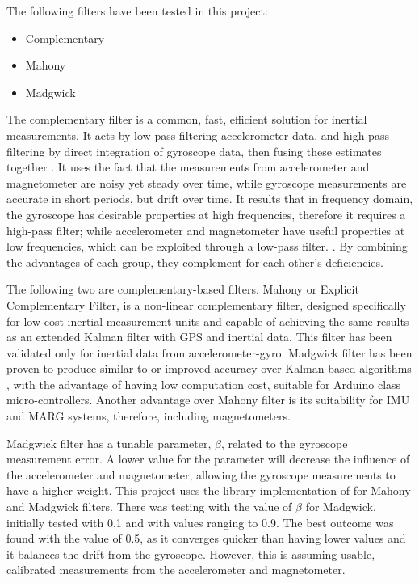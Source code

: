 The following filters have been tested in this project:
 
\begin{itemize}
\item Complementary
\item Mahony
\item Madgwick
\end{itemize}

The complementary filter is a common, fast, efficient solution for inertial measurements. It acts by low-pass filtering accelerometer data, and high-pass filtering by direct integration of gyroscope data, then fusing  these estimates together \cite{euston2008complementary}. 
It uses the fact that the measurements from accelerometer and magnetometer are noisy yet steady over time, while gyroscope measurements are accurate in short periods, but drift over time. It results that in frequency domain, the gyroscope has desirable properties at high frequencies, therefore it requires a high-pass filter; while accelerometer and magnetometer have useful properties at low frequencies, which can be exploited through a low-pass filter.  \cite{kok2017using}. By combining the advantages of each group, they complement for each other's deficiencies. 

The following two are complementary-based filters. 
Mahony or Explicit Complementary Filter, is a non-linear complementary filter, designed specifically for low-cost inertial measurement units and capable of achieving the same results as an extended Kalman filter with GPS and inertial data. This filter has been validated only for inertial data from accelerometer-gyro. \cite{euston2008complementary}
Madgwick filter has been proven to produce similar to \cite{cirillo2016comparison} or improved accuracy over Kalman-based algorithms \cite{madgwick2010efficient}, with the advantage of having low computation cost, suitable for Arduino class micro-controllers. Another advantage over Mahony filter is its suitability for IMU and MARG systems, therefore, including magnetometers.

Madgwick filter has a tunable parameter, $\beta$, related to the gyroscope measurement error. A lower value for the parameter will decrease the influence of the accelerometer and magnetometer, allowing the gyroscope measurements to have a higher weight\cite{madgwick2010efficient}. This project uses the library implementation of \cite{SensorFusion} for Mahony and Madgwick filters. There was testing with the value of $\beta$ for Madgwick, initially tested with 0.1 and with values ranging to 0.9. The best outcome was found with the value of 0.5, as it converges quicker than having lower values and it balances the drift from the gyroscope. However, this is assuming usable, calibrated measurements from the accelerometer and magnetometer.

